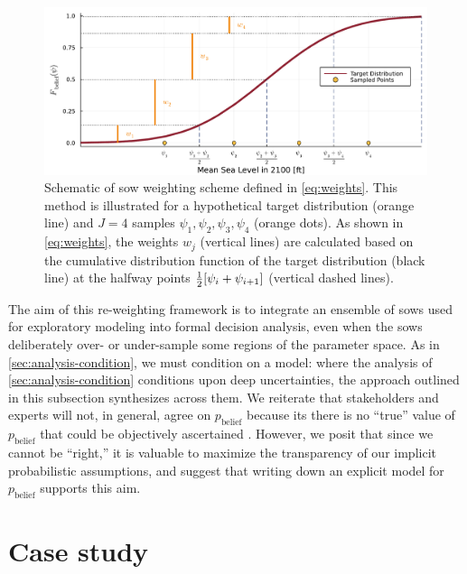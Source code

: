 \documentclass[11pt]{article}
\begin{document}
\begin{figure}
    \centering
    \includegraphics[width=\textwidth]{grid-sketch}
    \caption{
        Schematic of \gls{sow} weighting scheme defined in \cref{eq:weights}.
        This method is illustrated for a hypothetical target distribution (orange line) and $J=4$ samples $\psi_1, \psi_2, \psi_3, \psi_4$ (orange dots).
        As shown in \cref{eq:weights}, the weights $w_j$ (vertical lines) are calculated based on the cumulative distribution function of the target distribution  (black line) at the halfway points $\frac{1}{2}\qty[\psi_i+\psi_{i+1}]$ (vertical dashed lines).
    }\label{fig:grid-sketch}
\end{figure}

The aim of this re-weighting framework is to integrate an ensemble of \glspl{sow} used for exploratory modeling into formal decision analysis, even when the \glspl{sow} deliberately over- or under-sample some regions of the parameter space.
As in \cref{sec:analysis-condition}, we must condition on a model: where the analysis of \cref{sec:analysis-condition} conditions upon deep uncertainties, the approach outlined in this subsection synthesizes across them.
We reiterate that stakeholders and experts will not, in general, agree on $p_\mathrm{belief}$ because its there is no ``true'' value of $p_\mathrm{belief}$ that could be objectively ascertained \citep{oreskes_verification:1994,walker_deep:2013}.
However, we posit that since we cannot be ``right,'' it is valuable to maximize the transparency of our implicit probabilistic assumptions, and suggest that writing down an explicit model for $p_\mathrm{belief}$ supports this aim.

\section{Case study}\label{sec:case-study}
\end{document}
